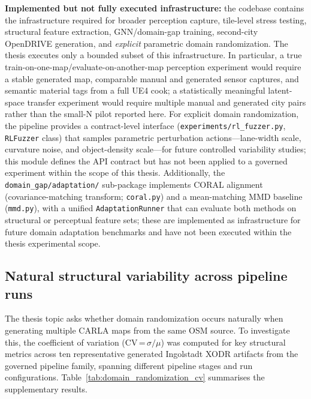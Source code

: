 \textbf{Implemented but not fully executed infrastructure:} the codebase contains the infrastructure required for broader perception capture, tile-level stress testing, structural feature extraction, GNN/domain-gap training, second-city OpenDRIVE generation, and \emph{explicit} parametric domain randomization. The thesis executes only a bounded subset of this infrastructure. In particular, a true train-on-one-map/evaluate-on-another-map perception experiment would require a stable generated map, comparable manual and generated sensor captures, and semantic material tags from a full UE4 cook; a statistically meaningful latent-space transfer experiment would require multiple manual and generated city pairs rather than the small-N pilot reported here. For explicit domain randomization, the pipeline provides a contract-level interface (\texttt{experiments/rl\_fuzzer.py}, \texttt{RLFuzzer} class) that samples parametric perturbation actions---lane-width scale, curvature noise, and object-density scale---for future controlled variability studies; this module defines the API contract but has not been applied to a governed experiment within the scope of this thesis. Additionally, the \texttt{domain\_gap/adaptation/} sub-package implements CORAL alignment (covariance-matching transform; \texttt{coral.py}) and a mean-matching MMD baseline (\texttt{mmd.py}), with a unified \texttt{AdaptationRunner} that can evaluate both methods on structural or perceptual feature sets; these are implemented as infrastructure for future domain adaptation benchmarks and have not been executed within the thesis experimental scope.

\subsection{Natural structural variability across pipeline runs}
\label{sec:domain_randomization}

The thesis topic asks whether domain randomization occurs naturally when generating multiple CARLA maps from the same OSM source. To investigate this, the coefficient of variation (CV\,=\,$\sigma/\mu$) was computed for key structural metrics across ten representative generated Ingolstadt XODR artifacts from the governed pipeline family, spanning different pipeline stages and run configurations. Table~\ref{tab:domain_randomization_cv} summarises the supplementary results.


